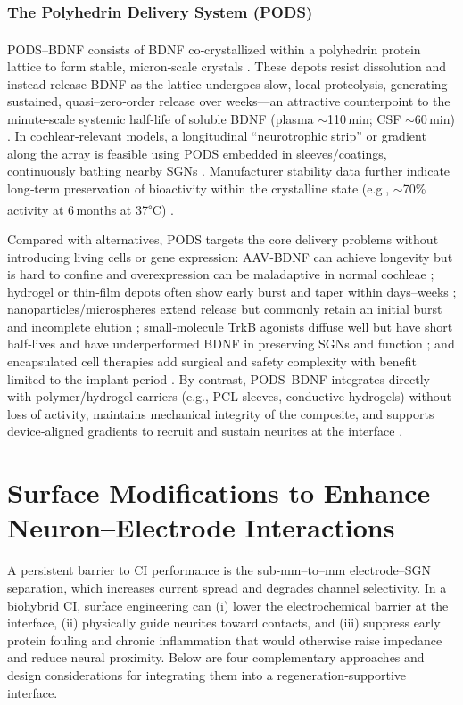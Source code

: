 \documentclass[referee,pdflatex, sn-vancouver-num]{sn-jnl}%
\theoremstyle{thmstyleone}%
\theoremstyle{thmstyletwo}%
\theoremstyle{thmstylethree}%
\begin{document}
\subsubsection{The Polyhedrin Delivery System (PODS\texorpdfstring{\textsuperscript{\textregistered}}{(R)})}
PODS\textsuperscript{\textregistered}–BDNF consists of BDNF co‑crystallized within a polyhedrin protein lattice to form stable, micron‑scale crystals \cite{Ikeda2006,Coulibaly2007,Coulibaly2009,Mori2007,Tanaka2007,Ijiri2009}. These depots resist dissolution and instead release BDNF as the lattice undergoes slow, local proteolysis, generating sustained, quasi–zero‑order release over weeks—an attractive counterpoint to the minute‑scale systemic half‑life of soluble BDNF (plasma $\sim$110\,min; CSF $\sim$60\,min) \cite{Mori2007,Poduslo1996,Sakane1997,Soderquist2009}. In cochlear‑relevant models, a longitudinal ``neurotrophic strip'' or gradient along the array is feasible using PODS embedded in sleeves/coatings, continuously bathing nearby SGNs \cite{Nella2022NeurotrophinGradients,Chang2020StemCellNiche}. Manufacturer stability data further indicate long‑term preservation of bioactivity within the crystalline state (e.g., $\sim$70\% activity at 6\,months at 37\textsuperscript{$\circ$}C) \cite{CellGS_PODS}.

Compared with alternatives, PODS targets the core delivery problems without introducing living cells or gene expression: AAV‑BDNF can achieve longevity but is hard to confine and overexpression can be maladaptive in normal cochleae \cite{Lee2016}; hydrogel or thin‑film depots often show early burst and taper within days–weeks \cite{Zimmermann2000}; nanoparticles/microspheres extend release but commonly retain an initial burst and incomplete elution \cite{Schmidt2018}; small‑molecule TrkB agonists diffuse well but have short half‑lives and have underperformed BDNF in preserving SGNs and function \cite{vink2022,heuer2021}; and encapsulated cell therapies add surgical and safety complexity with benefit limited to the implant period \cite{Pettingill2011}. By contrast, PODS–BDNF integrates directly with polymer/hydrogel carriers (e.g., PCL sleeves, conductive hydrogels) without loss of activity, maintains mechanical integrity of the composite, and supports device‑aligned gradients to recruit and sustain neurites at the interface \cite{Nella2022NeurotrophinGradients,Chang2020}.

\section{Surface Modifications to Enhance Neuron--Electrode Interactions}\label{sec6}\label{sec:materials_stack}
\noindent
A persistent barrier to CI performance is the sub‑mm–to–mm electrode–SGN separation, which increases current spread and degrades channel selectivity. In a biohybrid CI, surface engineering can (i) lower the electrochemical barrier at the interface, (ii) physically guide neurites toward contacts, and (iii) suppress early protein fouling and chronic inflammation that would otherwise raise impedance and reduce neural proximity. Below are four complementary approaches and design considerations for integrating them into a regeneration‑supportive interface.
\end{document}
